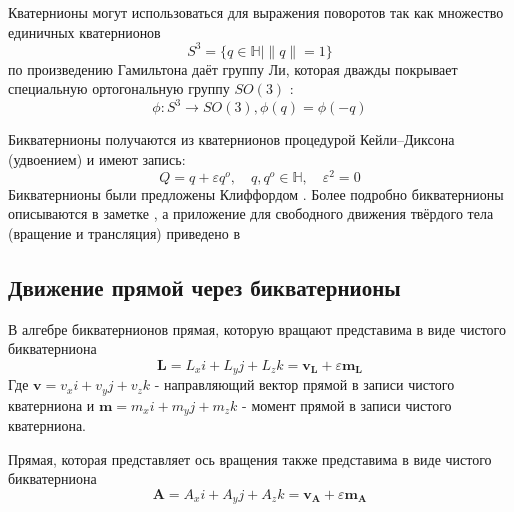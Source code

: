  Кватернионы могут использоваться для выражения поворотов \autocite[Гл. N]{chelnokov2006кватернионные} так как множество единичных кватернионов 
  \begin{equation*}
    S^3 = \{q \in \mathbb{H} \mid \|q\| =1\}
  \end{equation*}
  по произведению Гамильтона даёт группу Ли, которая дважды покрывает специальную ортогональную группу $SO(3)$ \autocite[Гл. 12]{altmann1986rotations}:
  \begin{equation*}
    \phi : S^3 \rightarrow SO(3), \phi(q) = \phi(-q)
  \end{equation*}

  Бикватернионы получаются из кватернионов процедурой Кейли--Диксона (удвоением) и имеют запись:
  \begin{equation*}
    Q = q + \varepsilon q^o, \quad q,q^o \in \mathbb{H}, \quad \varepsilon^2=0
  \end{equation*}
  Бикватернионы были предложены Клиффордом \autocite{cliffordPreliminarySketchBiquaternions1871}. Более подробно бикватернионы описываются в заметке \autocite{jiaDualQuaternions2018},
  а приложение для свободного движения твёрдого тела (вращение и трансляция) приведено в \autocite[Гл. N]{chelnokov2006кватернионные}

  \subsection{Движение прямой через бикватернионы}

  В алгебре бикватернионов прямая, которую вращают представима в виде чистого бикватерниона
  \begin{equation*}
    \mathbf{L} = L_x i + L_y j + L_z k = \mathbf{v}_\mathbf{L} + \varepsilon \mathbf{m}_\mathbf{L}
  \end{equation*}
  Где $\mathbf{v} = v_x i + v_y j + v_z k$ - направляющий вектор прямой в записи чистого кватерниона и $\mathbf{m} = m_x i + m_y j + m_z k$ - момент прямой в записи чистого кватерниона.
  
  Прямая, которая представляет ось вращения также представима в виде чистого бикватерниона
  \begin{equation*}
    \mathbf{A} = A_x i + A_y j + A_z k = \mathbf{v}_\mathbf{A} + \varepsilon \mathbf{m}_\mathbf{A}
  \end{equation*}

